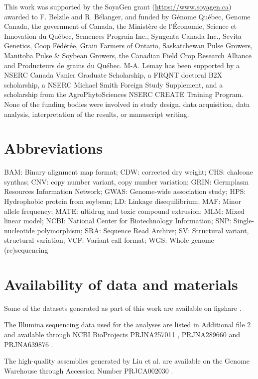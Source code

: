 \documentclass[doublespacing]{bmcart}
\begin{document}
\begin{backmatter}
This work was supported by the SoyaGen grant (\url{https://www.soyagen.ca})
awarded to F. Belzile and R. Bélanger, and funded by Génome Québec, Genome
Canada, the government of Canada, the Ministère de l'Économie, Science et
Innovation du Québec, Semences Prograin Inc., Syngenta Canada Inc., Sevita
Genetics, Coop Fédérée, Grain Farmers of Ontario, Saskatchewan Pulse Growers,
Manitoba Pulse \& Soybean Growers, the Canadian Field Crop Research Alliance
and Producteurs de grains du Québec. M-A. Lemay has been supported by a NSERC
Canada Vanier Graduate Scholarship, a FRQNT doctoral B2X scholarship, a NSERC
Michael Smith Foreign Study Supplement, and a scholarship from the
AgroPhytoSciences NSERC CREATE Training Program. None of the funding bodies
were involved in study design, data acquisition, data analysis, interpretation
of the results, or manuscript writing.

\section*{Abbreviations}%
BAM: Binary alignment map format;
CDW: corrected dry weight;
CHS: chalcone synthas;
CNV: copy number variant, copy number variation;
GRIN: Germplasm Resources Information Network;
GWAS: Genome-wide association study;
HPS: Hydrophobic protein from soybean;
LD: Linkage disequilibrium;
MAF: Minor allele frequency;
MATE: ultidrug and toxic compound extrusion;
MLM: Mixed linear model;
NCBI: National Center for Biotechnology Information;
SNP: Single-nucleotide polymorphism;
SRA: Sequence Read Archive;
SV: Structural variant, structural variation;
VCF: Variant call format;
WGS: Whole-genome (re)sequencing

\section*{Availability of data and materials}

Some of the datasets generated as part of this work are available on figshare
\citep{kmer-gwas-figshare}.

The Illumina sequencing data used for the analyses are listed in Additional file 2
and available through NCBI BioProjects PRJNA257011 \cite{PRJNA257011}, PRJNA289660 \cite{PRJNA289660}
and PRJNA639876 \cite{PRJNA639876}.

The high-quality assemblies generated by Liu et al. \cite{liu2020-pangenome} are available
on the Genome Warehouse through Accession Number PRJCA002030 \cite{PRJCA002030}.


\end{backmatter}
\end{document}
